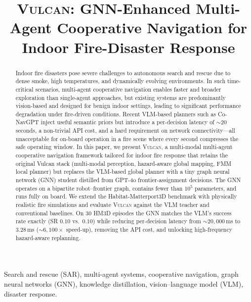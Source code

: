 \documentclass[conference]{IEEEtran}
\newcommand{\system}{\textsc{Vulcan}\xspace}
\begin{document}
\title{\system: GNN-Enhanced Multi-Agent Cooperative Navigation for Indoor Fire-Disaster Response}

\author{
}

\maketitle

\begin{abstract}
Indoor fire disasters pose severe challenges to autonomous search and rescue due to dense smoke, high temperatures, and dynamically evolving environments. In such time-critical scenarios, multi-agent cooperative navigation enables faster and broader exploration than single-agent approaches, but existing systems are predominantly vision-based and designed for benign indoor settings, leading to significant performance degradation under fire-driven conditions. Recent VLM-based planners such as Co-NavGPT inject useful semantic priors but introduce a per-decision latency of $\sim$20\,seconds, a non-trivial API cost, and a hard requirement on network connectivity---all unacceptable for on-board operation in a fire scene where every second compresses the safe operating window. In this paper, we present \system, a multi-modal multi-agent cooperative navigation framework tailored for indoor fire response that retains the original Vulcan stack (multi-modal perception, hazard-aware global mapping, FMM local planner) but replaces the VLM-based global planner with a tiny graph neural network (GNN) student distilled from GPT-4o frontier-assignment decisions. The GNN operates on a bipartite robot--frontier graph, contains fewer than $10^5$ parameters, and runs fully on board. We extend the Habitat-Matterport3D benchmark with physically realistic fire simulations and evaluate \system against the VLM teacher and conventional baselines. On 30 HM3D episodes the GNN matches the VLM's success rate exactly (SR $0.10$ vs.\ $0.10$) while reducing per-decision latency from ${\sim}20{,}000$\,ms to $3.28$\,ms (${\sim}6{,}100\times$ speed-up), removing the API cost, and unlocking high-frequency hazard-aware replanning.
\end{abstract}

\begin{IEEEkeywords}
Search and rescue (SAR), multi-agent systems, cooperative navigation, graph neural networks (GNN), knowledge distillation, vision--language model (VLM), disaster response.
\end{IEEEkeywords}
\end{document}
